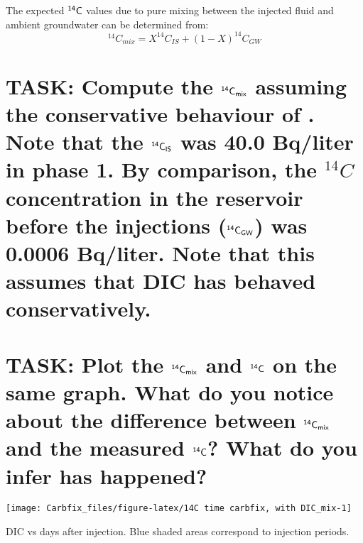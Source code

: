 \documentclass[nofonts,x11names]{tufte-handout}
\begin{document}
\noindent The expected \(\sf ^{14}C\) values due to pure mixing between
the injected fluid and ambient groundwater can be determined from:
\begin{equation}
^{14}C_{mix}=X^{14}C_{IS}+(1-X)^{14}C_{GW}
\end{equation}

\section{\texorpdfstring{TASK: Compute the \(\sf ^{14}C_{mix}\) assuming
the conservative behaviour of . Note that the
\(\sf ^{14}C_{IS}\) was 40.0 Bq/liter in phase 1. By comparison, the
\(^{14}C\) concentration in the reservoir before the injections
(\(\sf ^{14}C_{GW}\)) was 0.0006 Bq/liter. Note that this assumes that
DIC has behaved
conservatively.}{TASK: Compute the \textbackslash sf \^{}\{14\}C\_\{mix\} assuming the conservative behaviour of . Note that the \textbackslash sf \^{}\{14\}C\_\{IS\} was 40.0 Bq/liter in phase 1. By comparison, the \^{}\{14\}C concentration in the reservoir before the injections (\textbackslash sf \^{}\{14\}C\_\{GW\}) was 0.0006 Bq/liter. Note that this assumes that DIC has behaved conservatively.}}\label{task-compute-the-sf-14c_mix-assuming-the-conservative-behaviour-of-.-note-that-the-sf-14c_is-was-40.0-bqliter-in-phase-1.-by-comparison-the-14c-concentration-in-the-reservoir-before-the-injections-sf-14c_gw-was-0.0006-bqliter.-note-that-this-assumes-that-dic-has-behaved-conservatively.}

\section{\texorpdfstring{TASK: Plot the \(\sf ^{14}C_{mix}\) and
\(\sf ^{14}C\) on the same graph. What do you notice about the
difference between \(\sf ^{14}C_{mix}\) and the measured \(\sf ^{14}C\)?
What do you infer has
happened?}{TASK: Plot the \textbackslash sf \^{}\{14\}C\_\{mix\} and \textbackslash sf \^{}\{14\}C on the same graph. What do you notice about the difference between \textbackslash sf \^{}\{14\}C\_\{mix\} and the measured \textbackslash sf \^{}\{14\}C? What do you infer has happened?}}\label{task-plot-the-sf-14c_mix-and-sf-14c-on-the-same-graph.-what-do-you-notice-about-the-difference-between-sf-14c_mix-and-the-measured-sf-14c-what-do-you-infer-has-happened}

\begin{marginfigure}[-2cm]
\texttt{[image: Carbfix\_files/figure-latex/14C time carbfix, with DIC\_mix-1]} \caption[DIC vs days after injection]{DIC vs days after injection.  Blue shaded areas correspond to injection periods.}\label{fig:14C time carbfix, with DIC_mix}
\end{marginfigure}
\end{document}
